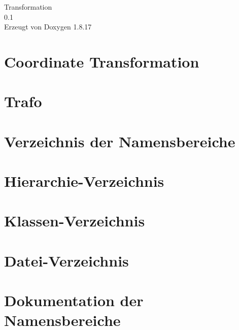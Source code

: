 \let\mypdfximage\pdfximage\def\pdfximage{\immediate\mypdfximage}\documentclass[twoside]{book}
\newcommand{\+}{\discretionary{\mbox{\scriptsize$\hookleftarrow$}}{}{}}
\newcommand{\clearemptydoublepage}{%
  \newpage{\pagestyle{empty}\cleardoublepage}%
}
\begin{document}
\hypersetup{pageanchor=false,
             bookmarksnumbered=true,
             pdfencoding=unicode
            }
\begin{titlepage}
\vspace*{7cm}
\begin{center}%
{\Large Transformation \\[1ex]\large 0.\+1 }\\
\vspace*{1cm}
{\large Erzeugt von Doxygen 1.8.17}\\
\end{center}
\end{titlepage}
\clearemptydoublepage
{}
\tableofcontents
\clearemptydoublepage
{}
\hypersetup{pageanchor=true}

\chapter{Coordinate Transformation}
\label{index}\hypertarget{index}{}
\chapter{Trafo}
\label{md__c_1__users__yang_xiaofei__desktop__workplace0115__transformation1_bin__r_e_a_d_m_e}

\chapter{Verzeichnis der Namensbereiche}

\chapter{Hierarchie-\/\+Verzeichnis}

\chapter{Klassen-\/\+Verzeichnis}

\chapter{Datei-\/\+Verzeichnis}

\chapter{Dokumentation der Namensbereiche}







\end{document}
